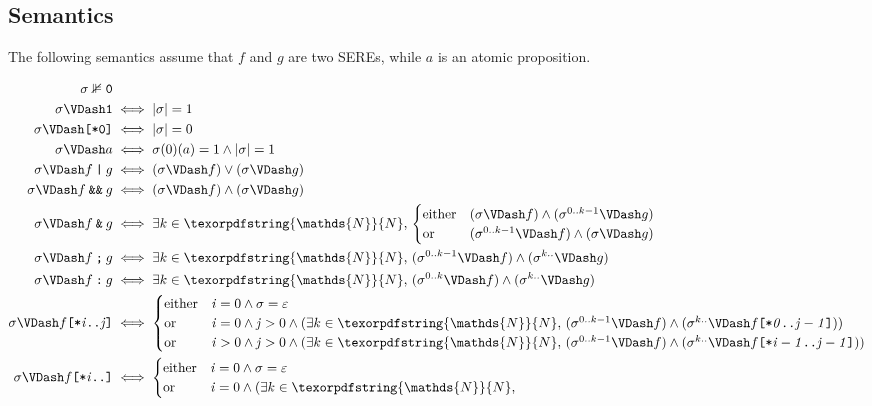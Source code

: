 \documentclass[a4paper,twoside,10pt,DIV=12]{scrreprt}
\newcommand{\N}{\texorpdfstring{\ensuremath{\mathds{N}}}{N}}
\newcommand{\OR}{\mathbin{\texttt{|}}}
\newcommand{\AND}{\mathbin{\texttt{\&}}}
\newcommand{\ANDALT}{\mathbin{\texttt{\&\&}}}
\newcommand{\FUSION}{\mathbin{\texttt{:}}}
\newcommand{\CONCAT}{\mathbin{\texttt{;}}}
\newcommand{\0}{\texttt{0}}
\newcommand{\1}{\texttt{1}}
\newcommand{\STAR}[1]{\texttt{[*#1]}}
\newcommand{\eword}{\texttt{[*0]}}
\newcommand\mvar[1]{\ensuremath{\mathit{#1}}}
\begin{document}
\subsection{Semantics}

The following semantics assume that $f$ and $g$ are two SEREs, while
$a$ is an atomic proposition.

{\allowdisplaybreaks
\begin{align*}
  \sigma\nVDash \0    &\\
  \sigma\VDash \1     & \iff |\sigma|=1\\
  \sigma\VDash \eword & \iff |\sigma|=0 \\
  \sigma\VDash a      & \iff \sigma(0)(a)=1 \land |\sigma|=1\\
  \sigma\VDash f\OR g &\iff (\sigma\VDash f) \lor (\sigma\VDash g) \\
  \sigma\VDash f\ANDALT g &\iff (\sigma \VDash f) \land (\sigma\VDash g) \\
  \sigma\VDash f\AND g &\iff \exists k\in\N,\,
  \begin{cases}
    \text{either} &(\sigma \VDash f) \land (\sigma^{0..k-1} \VDash g)\\
    \text{or} &(\sigma^{0..k-1} \VDash f) \land (\sigma \VDash g)
  \end{cases} \\
  \sigma\VDash f\CONCAT g&\iff \exists k\in\N,\,(\sigma^{0..k-1} \VDash f)\land(\sigma^{k..} \VDash g)\\
  \sigma\VDash f\FUSION g&\iff \exists k\in\N,\,(\sigma^{0..k} \VDash f)\land(\sigma^{k..} \VDash g)\\
  \sigma\VDash f\STAR{\mvar{i}..\mvar{j}}& \iff
  \begin{cases}
    \text{either} & \mvar{i}=0 \land \sigma=\varepsilon \\
    \text{or} & \mvar{i}=0 \land \mvar{j}>0 \land (\exists k\in\N,\,
      (\sigma^{0..k-1}\VDash f) \land (\sigma^{k..}
      \VDash f\STAR{\mvar{0}..\mvar{j-1}}))\\
    \text{or} & \mvar{i}>0 \land \mvar{j}>0 \land (\exists k\in\N,\,
      (\sigma^{0..k-1}\VDash f) \land (\sigma^{k..}
      \VDash f\STAR{\mvar{i-1}..\mvar{j-1}}))\\
  \end{cases}\\
  \sigma\VDash f\STAR{\mvar{i}..} & \iff
  \begin{cases}
    \text{either} & \mvar{i}=0 \land \sigma=\varepsilon \\
    \text{or} & \mvar{i}=0 \land (\exists k\in\N,\,

\end{cases}
\end{align*}}
\end{document}
